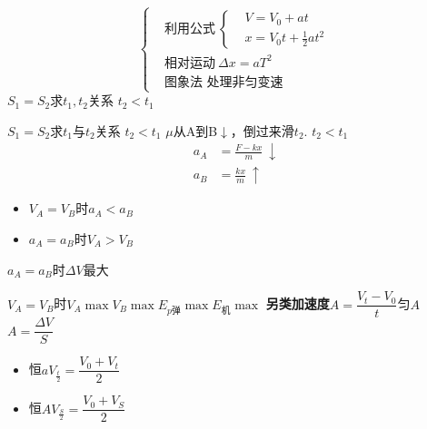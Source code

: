 \[
\left\{\begin{aligned}
&\text{利用公式}\ \left\{\begin{aligned}&V=V_0+at\\&x=V_0t+\tfrac12at^2\end{aligned}\right.\\[6pt]
&\text{相对运动}\ \Delta x=aT^2\\[6pt]
&\text{图象法\ \ 处理非匀变速}
\end{aligned}\right.
\]
$S_1=S_2$\quad 求$t_1,t_2$关系
$t_2<t_1$

$S_1=S_2$\quad 求$t_1$与$t_2$关系
$t_2<t_1$
$\mu$从A到B$\downarrow$，倒过来滑$t_2$.
$t_2<t_1$
\begin{align*}
a_A&=\frac{F-kx}{m}\ \downarrow\\
a_B&=\frac{kx}{m}\ \uparrow
\end{align*}
\begin{itemize}
\item $V_A=V_B$时\quad $a_A<a_B$
\item $a_A=a_B$时\quad $V_A>V_B$
\end{itemize}

$a_A=a_B$时\quad $\Delta V$最大

$V_A=V_B$时\quad $V_A\max$\quad $V_B\max$\quad $E_{p\text{弹}}\max$\quad $E_{\text{机}}\max$ %
\textbf{另类加速度}\quad $A=\dfrac{V_t-V_0}{t}$\quad 匀$A$\quad\quad $A=\dfrac{\Delta V}{S}$
\begin{itemize}
\item 恒$a$\quad $V_{\frac t2}=\dfrac{V_0+V_t}{2}$
\item 恒$A$\quad $V_{\frac S2}=\dfrac{V_0+V_S}{2}$
\end{itemize}
